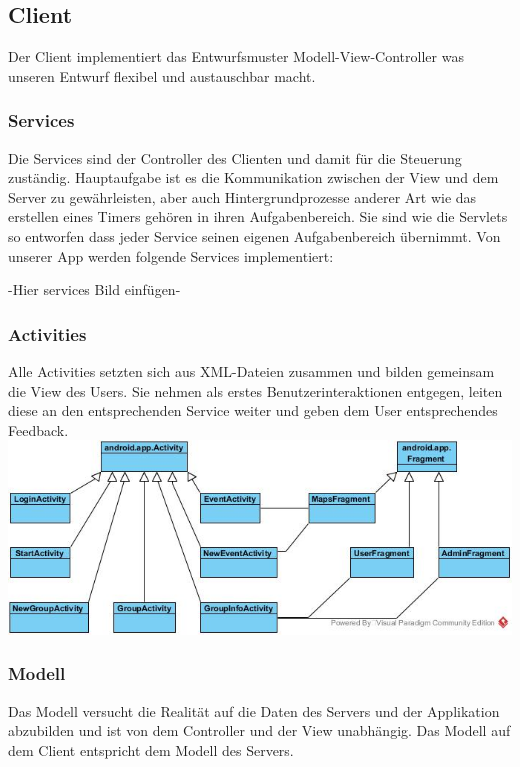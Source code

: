 	\subsection{Client}
	Der Client implementiert das Entwurfsmuster Modell-View-Controller was unseren Entwurf flexibel und austauschbar macht.
	\subsubsection{Services}
	Die Services sind der Controller des Clienten und damit für die Steuerung zuständig. Hauptaufgabe ist es die Kommunikation zwischen der View und dem Server zu gewährleisten, aber auch Hintergrundprozesse anderer Art wie das erstellen eines Timers gehören in ihren Aufgabenbereich.
Sie sind wie die Servlets so entworfen dass jeder Service seinen eigenen Aufgabenbereich übernimmt.
Von unserer App werden folgende Services implementiert:

-Hier services Bild einfügen-

	\subsubsection{Activities}
	Alle Activities setzten sich aus XML-Dateien zusammen und bilden gemeinsam die View des Users.
Sie nehmen als erstes Benutzerinteraktionen entgegen, leiten diese an den entsprechenden Service weiter und geben dem User entsprechendes Feedback.
	\newline
	\includegraphics[width=1\textwidth]{ViewClassDiagram.jpg}
	
	\subsubsection{Modell}
Das Modell versucht die Realität auf die Daten des Servers und der Applikation abzubilden und ist von dem Controller und der View unabhängig. 
Das Modell auf dem Client entspricht dem Modell des Servers.
